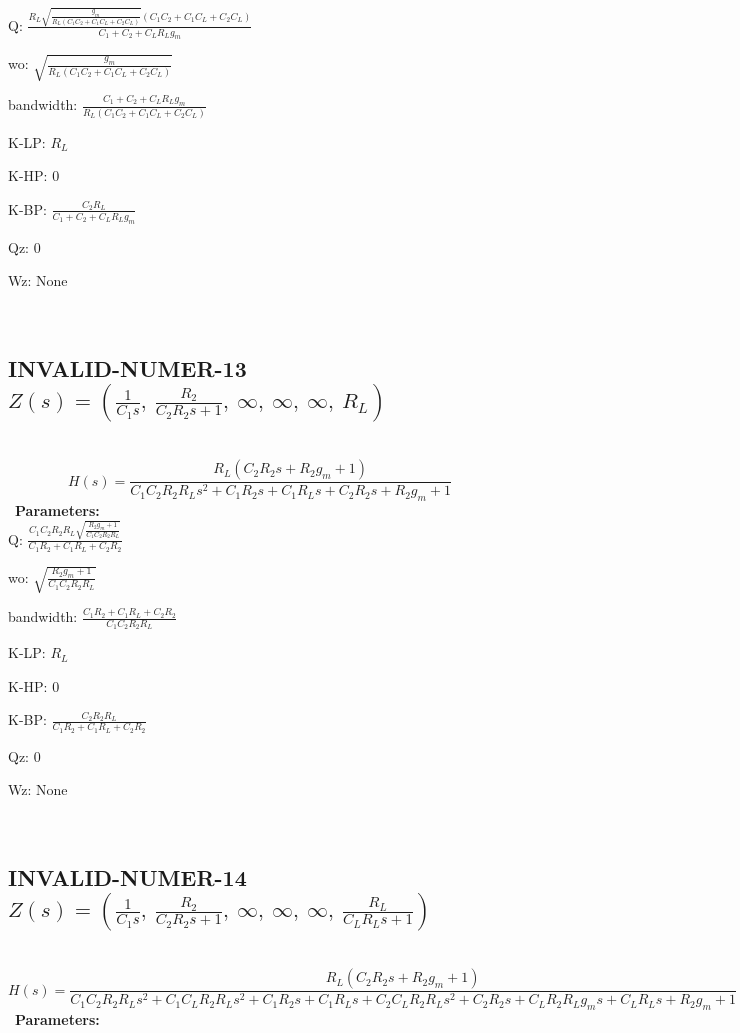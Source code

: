 \documentclass{article}
\begin{document}
Q: $\frac{R_{L} \sqrt{\frac{g_{m}}{R_{L} \left(C_{1} C_{2} + C_{1} C_{L} + C_{2} C_{L}\right)}} \left(C_{1} C_{2} + C_{1} C_{L} + C_{2} C_{L}\right)}{C_{1} + C_{2} + C_{L} R_{L} g_{m}}$\ 

wo: $\sqrt{\frac{g_{m}}{R_{L} \left(C_{1} C_{2} + C_{1} C_{L} + C_{2} C_{L}\right)}}$\ 

bandwidth: $\frac{C_{1} + C_{2} + C_{L} R_{L} g_{m}}{R_{L} \left(C_{1} C_{2} + C_{1} C_{L} + C_{2} C_{L}\right)}$\ 

K-LP: $R_{L}$\ 

K-HP: $0$\ 

K-BP: $\frac{C_{2} R_{L}}{C_{1} + C_{2} + C_{L} R_{L} g_{m}}$\ 

Qz: $0$\ 

Wz: $\text{None}$\ 

\ 

\subsection{INVALID-NUMER-13 $Z(s) = \left( \frac{1}{C_{1} s}, \  \frac{R_{2}}{C_{2} R_{2} s + 1}, \  \infty, \  \infty, \  \infty, \  R_{L}\right)$ } \ 
\textbf{\[H(s) = \frac{R_{L} \left(C_{2} R_{2} s + R_{2} g_{m} + 1\right)}{C_{1} C_{2} R_{2} R_{L} s^{2} + C_{1} R_{2} s + C_{1} R_{L} s + C_{2} R_{2} s + R_{2} g_{m} + 1}\] } \ 
\textbf{Parameters:}\\ 

Q: $\frac{C_{1} C_{2} R_{2} R_{L} \sqrt{\frac{R_{2} g_{m} + 1}{C_{1} C_{2} R_{2} R_{L}}}}{C_{1} R_{2} + C_{1} R_{L} + C_{2} R_{2}}$\ 

wo: $\sqrt{\frac{R_{2} g_{m} + 1}{C_{1} C_{2} R_{2} R_{L}}}$\ 

bandwidth: $\frac{C_{1} R_{2} + C_{1} R_{L} + C_{2} R_{2}}{C_{1} C_{2} R_{2} R_{L}}$\ 

K-LP: $R_{L}$\ 

K-HP: $0$\ 

K-BP: $\frac{C_{2} R_{2} R_{L}}{C_{1} R_{2} + C_{1} R_{L} + C_{2} R_{2}}$\ 

Qz: $0$\ 

Wz: $\text{None}$\ 

\ 

\subsection{INVALID-NUMER-14 $Z(s) = \left( \frac{1}{C_{1} s}, \  \frac{R_{2}}{C_{2} R_{2} s + 1}, \  \infty, \  \infty, \  \infty, \  \frac{R_{L}}{C_{L} R_{L} s + 1}\right)$ } \ 
\textbf{\[H(s) = \frac{R_{L} \left(C_{2} R_{2} s + R_{2} g_{m} + 1\right)}{C_{1} C_{2} R_{2} R_{L} s^{2} + C_{1} C_{L} R_{2} R_{L} s^{2} + C_{1} R_{2} s + C_{1} R_{L} s + C_{2} C_{L} R_{2} R_{L} s^{2} + C_{2} R_{2} s + C_{L} R_{2} R_{L} g_{m} s + C_{L} R_{L} s + R_{2} g_{m} + 1}\] } \ 
\textbf{Parameters:}\\ 
\end{document}
